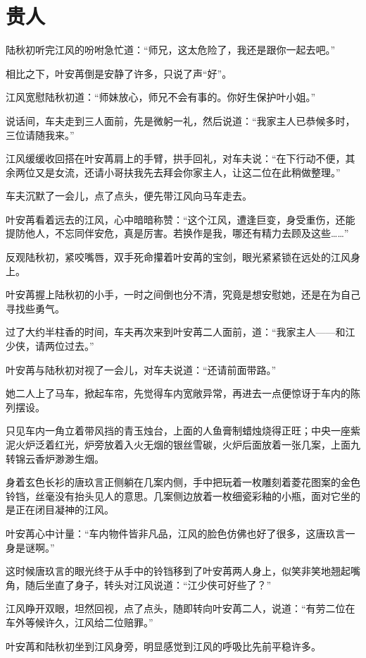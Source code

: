 \chapter{贵人}
陆秋初听完江风的吩咐急忙道：“师兄，这太危险了，我还是跟你一起去吧。”

相比之下，叶安苒倒是安静了许多，只说了声“好”。

江风宽慰陆秋初道：“师妹放心，师兄不会有事的。你好生保护叶小姐。”

说话间，车夫走到三人面前，先是微躬一礼，然后说道：“我家主人已恭候多时，三位请随我来。”

江风缓缓收回搭在叶安苒肩上的手臂，拱手回礼，对车夫说：“在下行动不便，其余两位又是女流，还请小哥扶我先去拜会你家主人，让这二位在此稍做整理。”

车夫沉默了一会儿，点了点头，便先带江风向马车走去。

叶安苒看着远去的江风，心中暗暗称赞：“这个江风，遭逢巨变，身受重伤，还能提防他人，不忘同伴安危，真是厉害。若换作是我，哪还有精力去顾及这些……”

反观陆秋初，紧咬嘴唇，双手死命攥着叶安苒的宝剑，眼光紧紧锁在远处的江风身上。

叶安苒握上陆秋初的小手，一时之间倒也分不清，究竟是想安慰她，还是在为自己寻找些勇气。

过了大约半柱香的时间，车夫再次来到叶安苒二人面前，道：“我家主人——和江少侠，请两位过去。”

叶安苒与陆秋初对视了一会儿，对车夫说道：“还请前面带路。”

她二人上了马车，掀起车帘，先觉得车内宽敞异常，再进去一点便惊讶于车内的陈列摆设。

只见车内一角立着带风挡的青玉烛台，上面的人鱼膏制蜡烛烧得正旺；中央一座紫泥火炉泛着红光，炉旁放着入火无烟的银丝雪碳，火炉后面放着一张几案，上面九转锦云香炉渺渺生烟。

身着玄色长衫的唐玖言正侧躺在几案内侧，手中把玩着一枚雕刻着菱花图案的金色铃铛，丝毫没有抬头见人的意思。几案侧边放着一枚细瓷彩釉的小瓶，面对它坐的是正在闭目凝神的江风。

叶安苒心中计量：“车内物件皆非凡品，江风的脸色仿佛也好了很多，这唐玖言一身是谜啊。”

这时候唐玖言的眼光终于从手中的铃铛移到了叶安苒两人身上，似笑非笑地翘起嘴角，随后坐直了身子，转头对江风说道：“江少侠可好些了？”

江风睁开双眼，坦然回视，点了点头，随即转向叶安苒二人，说道：“有劳二位在车外等候许久，江风给二位赔罪。”

叶安苒和陆秋初坐到江风身旁，明显感觉到江风的呼吸比先前平稳许多。

